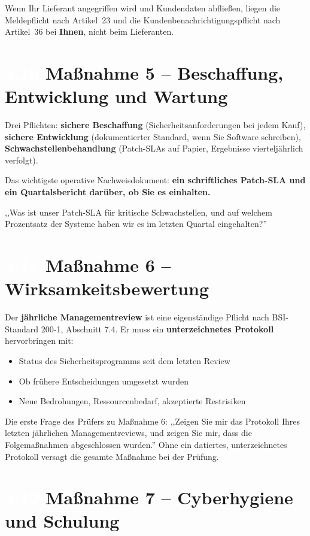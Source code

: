 \documentclass[11pt,a4paper,twoside]{book}
\newcommand{\lessontag}[1]{%
  \texorpdfstring{%
    \setlength{\fboxsep}{3pt}\colorbox{nisd2blue}{\textcolor{white}{\footnotesize\bfseries #1}}\quad%
  }{Lektion #1\ }%
}
\begin{document}
Wenn Ihr Lieferant angegriffen wird und Kundendaten abfließen, liegen die Meldepflicht nach Artikel~23 und die Kundenbenachrichtigungspflicht nach Artikel~36 bei \textbf{Ihnen}, nicht beim Lieferanten.

\section{\lessontag{2.10}Maßnahme 5 -- Beschaffung, Entwicklung und Wartung}

Drei Pflichten: \textbf{sichere Beschaffung} (Sicherheitsanforderungen bei jedem Kauf), \textbf{sichere Entwicklung} (dokumentierter Standard, wenn Sie Software schreiben), \textbf{Schwachstellenbehandlung} (Patch-SLAs auf Papier, Ergebnisse vierteljährlich verfolgt).

Das wichtigste operative Nachweisdokument: \textbf{ein schriftliches Patch-SLA und ein Quartalsbericht darüber, ob Sie es einhalten.}

\begin{actionbox}
,,Was ist unser Patch-SLA für kritische Schwachstellen, und auf welchem Prozentsatz der Systeme haben wir es im letzten Quartal eingehalten?''
\end{actionbox}

\section{\lessontag{2.11}Maßnahme 6 -- Wirksamkeitsbewertung}

Der \textbf{jährliche Managementreview} ist eine eigenständige Pflicht nach BSI-Standard 200-1, Abschnitt 7.4. Er muss ein \textbf{unterzeichnetes Protokoll} hervorbringen mit:
\begin{itemize}
  \item Status des Sicherheitsprogramms seit dem letzten Review
  \item Ob frühere Entscheidungen umgesetzt wurden
  \item Neue Bedrohungen, Ressourcenbedarf, akzeptierte Restrisiken
\end{itemize}

Die erste Frage des Prüfers zu Maßnahme 6: ,,Zeigen Sie mir das Protokoll Ihres letzten jährlichen Managementreviews, und zeigen Sie mir, dass die Folgemaßnahmen abgeschlossen wurden.'' Ohne ein datiertes, unterzeichnetes Protokoll versagt die gesamte Maßnahme bei der Prüfung.

\section{\lessontag{2.12}Maßnahme 7 -- Cyberhygiene und Schulung}
\end{document}
